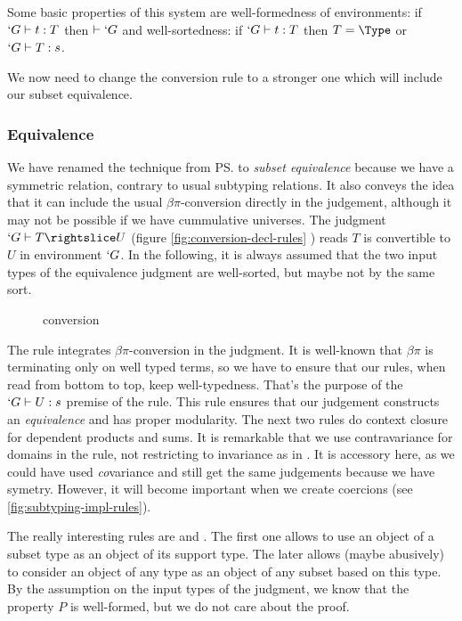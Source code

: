 \documentclass{llncs}
\begin{document}
Some basic properties of this system are well-formedness of
environments: if $`G \vdash t : T$ then $\vdash `G$ and
well-sortedness: if $`G \vdash t : T$ then $T = \Type$ or $`G \vdash T :
s$.

We now need to change the conversion rule to a stronger one which will
include our subset equivalence.

\subsubsection{Equivalence}
We have renamed the technique from \ps{} to 
\emph{subset equivalence} because we have a symmetric relation, contrary
to usual subtyping relations. It also conveys the idea that it can
include the usual $\beta\pi$-conversion directly in the judgement, 
although it may not be possible if we have cummulative universes.
The judgment $`G \typed T \subd{} U$ (figure
\vref{fig:conversion-decl-rules}  ) reads $T$ is convertible to $U$ in
environment $`G$. In the following, it is always assumed that the two
input types of the equivalence judgment are well-sorted, but maybe not by the same sort.

\begin{figure}[h]
  \subtdRules
  \caption{\Russell{} conversion}
  \label{fig:conversion-decl-rules}
\end{figure}

The rule  integrates $\beta\pi$-conversion in the
judgment. It is well-known that $\beta\pi$ is
terminating only on well typed terms, so we have to
ensure that our rules, when read from bottom to top, keep
well-typedness. That's the purpose of
the $`G \vdash U : s$ premise of the  rule. This rule
ensures that our judgement constructs an \emph{equivalence} and has
proper modularity. The next two rules do context closure for dependent
products and sums. It is remarkable that we use contravariance
\cite{journals/toplas/Castagna95} for
domains in the  rule, not restricting to invariance as in
\PVS. It is accessory here, as we could have used \emph{co}variance and
still get the same judgements because we have symetry. However, it will
become important when we create coercions (see
\vref{fig:subtyping-impl-rules}).

The really interesting rules are  and
. The first one allows to use an object of a subset type
as an object of its support type. The later allows (maybe abusively) to
consider an object of any type as an object of any subset based on
this type. By the assumption on the input types of the judgment, we know
that the property $P$ is well-formed, but we do not care about the proof.
\end{document}
